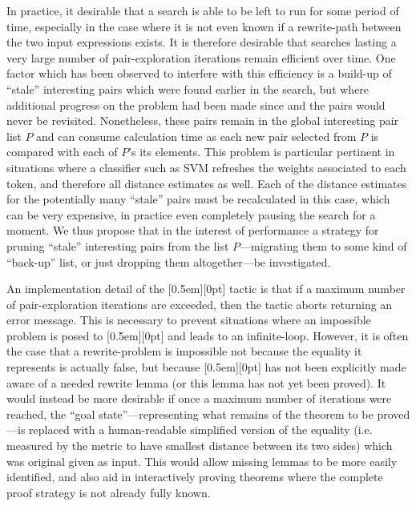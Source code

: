\documentclass[a4paper]{article}
\theoremstyle{plain}
\theoremstyle{definition}
\newcommand{\xx}[1]{{\colorbox{gray!15}{\raisebox{0em}[0.5em][0pt]{\makebox[\width-0.4em]{\texttt{#1}}}}}}
\begin{document}
In practice, it desirable that a search is able to be left to run for some period of time, especially in the case where it is not even known if a rewrite-path between the two input expressions exists. It is therefore desirable that searches lasting a very large number of pair-exploration iterations remain efficient over time. One factor which has been observed to interfere with this efficiency is a build-up of ``stale'' interesting pairs which were found earlier in the search, but where additional progress on the problem had been made since and the pairs would never be revisited. Nonetheless, these pairs remain in the global interesting pair list $P$ and can consume calculation time as each new pair selected from $P$ is compared with each of $P$'s its elements. This problem is particular pertinent in situations where a classifier such as SVM refreshes the weights associated to each token, and therefore all distance estimates as well. Each of the distance estimates for the potentially many ``stale'' pairs must be recalculated in this case, which can be very expensive, in practice even completely pausing the search for a moment. We thus propose that in the interest of performance a strategy for pruning ``stale'' interesting pairs from the list $P$---migrating them to some kind of ``back-up'' list, or just dropping them altogether---be investigated.

An implementation detail of the \xx{rewrite\_search} tactic is that if a maximum number of pair-exploration iterations are exceeded, then the tactic aborts returning an error message. This is necessary to prevent situations where an impossible problem is posed to \xx{rewrite\_search} and leads to an infinite-loop. However, it is often the case that a rewrite-problem is impossible not because the equality it represents is actually false, but because \xx{rewrite\_search} has not been explicitly made aware of a needed rewrite lemma (or this lemma has not yet been proved). It would instead be more desirable if once a maximum number of iterations were reached, the ``goal state''---representing what remains of the theorem to be proved---is replaced with a human-readable simplified version of the equality (i.e. measured by the metric to have smallest distance between its two sides) which was original given as input. This would allow missing lemmas to be more easily identified, and also aid in interactively proving theorems where the complete proof strategy is not already fully known.
\end{document}
